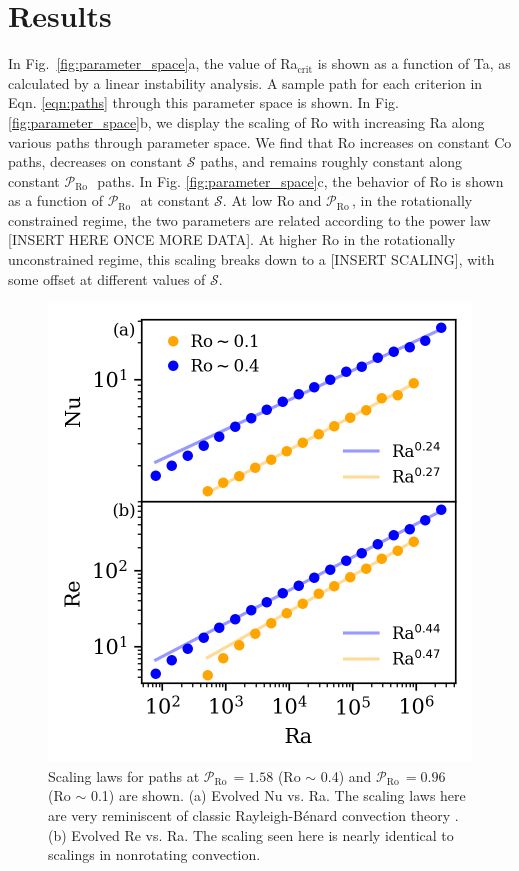 \documentclass[twocolumn, amsmath, amsfonts, amssymb]{aastex62}
\newcommand{\RB}{Rayleigh-B\'{e}nard }
\newcommand{\pro}{\ensuremath{\mathcal{P}_{\text{Ro}}\,}}
\begin{document}
\section{Results}
\label{sec:results}
In Fig.~\ref{fig:parameter_space}a, the value of Ra$_{\text{crit}}$
is shown as a function of Ta, as
calculated by a linear instability analysis. A sample path for
each criterion in Eqn. \ref{eqn:paths} through
this parameter space is shown.
In Fig. \ref{fig:parameter_space}b, we display the scaling of Ro
with increasing Ra along various paths through parameter space.
We find that Ro increases on constant Co paths, decreases on constant $\mathcal{S}$
paths, and remains roughly constant along constant \pro$\,$ paths.
In Fig. \ref{fig:parameter_space}c, the behavior of Ro is shown as
a function of \pro$\,$ at constant $\mathcal{S}$.
At low Ro and \pro, in the rotationally constrained regime, the two parameters
are related according to the power law [INSERT HERE ONCE MORE DATA].
At higher Ro in the rotationally unconstrained regime, this scaling breaks down
to a [INSERT SCALING], with some offset at different values of $\mathcal{S}$.

\begin{figure}[t!]
    \includegraphics{./figs/nu_and_re.png}
    \caption{Scaling laws for paths at $\pro = 1.58$ (Ro $\sim$ 0.4) and
    $\pro = 0.96$ (Ro $\sim$ 0.1) are shown. 
    (a) Evolved Nu vs. Ra. The scaling laws here are very reminiscent of classic \RB convection
    theory \citep{ahlers&all2009}.
    (b) Evolved Re vs. Ra.
    The scaling seen here is nearly identical to scalings in nonrotating convection.
    \label{fig:nu_and_re} }
\end{figure}
\end{document}
